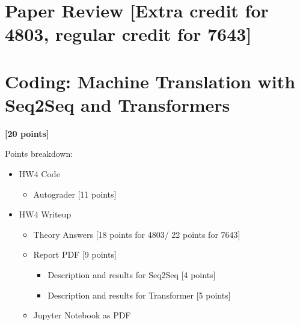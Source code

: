 \documentclass[11pt,english]{article}
\begin{document}
\section{Paper Review [Extra credit for 4803, regular credit for 7643]}



\section{Coding: Machine Translation with Seq2Seq and Transformers}

\textbf{[20 points]}


Points breakdown:
\begin{itemize}
    \item HW4 Code
    \begin{itemize}
        \item Autograder [11 points]
    \end{itemize}
    \item HW4 Writeup
    \begin{itemize}
        \item Theory Answers [18 points for 4803/ 22 points for 7643]
        \item Report PDF [9 points]
        \begin{itemize}
            \item Description and results for Seq2Seq [4 points]
            \item Description and results for Transformer [5 points]
        \end{itemize}
        \item Jupyter Notebook as PDF
    \end{itemize}
\end{itemize}
\end{document}
